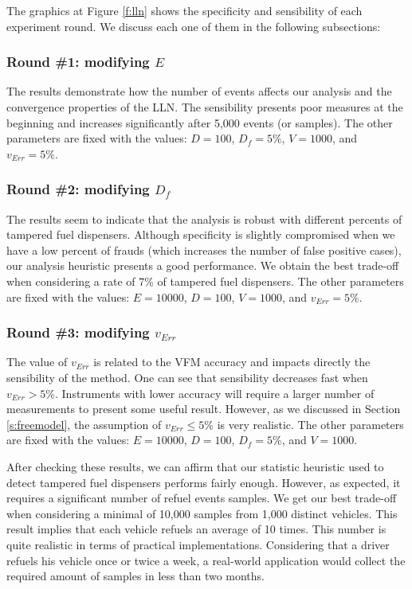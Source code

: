 \documentclass[sigplan]{acmart}
\begin{document}
The graphics at Figure \ref{f:lln} shows the specificity and sensibility of each experiment round.
We discuss each one of them in the following subsections:

\subsubsection{Round \#1: modifying $E$}
The results demonstrate how the number of events affects our analysis and the convergence properties of the LLN.
The sensibility presents poor measures at the beginning and increases significantly after 5,000 events (or samples).
The other parameters are fixed with the values: $D = 100$, $D_f = 5\%$, $V = 1000$, and $v_{Err} = 5\%$.

\subsubsection{Round \#2: modifying $D_f$}
The results seem to indicate that the analysis is robust with different percents of tampered fuel dispensers.
Although specificity is slightly compromised when we have a low percent of frauds (which increases the number of false positive cases), our analysis heuristic presents a good performance.
We obtain the best trade-off when considering a rate of 7\% of tampered fuel dispensers.
The other parameters are fixed with the values: $E = 10000$, $D = 100$, $V = 1000$, and $v_{Err} = 5\%$.

\subsubsection{Round \#3: modifying $v_{Err}$}
The value of $v_{Err}$ is related to the VFM accuracy and impacts directly the sensibility of the method.
One can see that sensibility decreases fast when $v_{Err} > 5\%$.
Instruments with lower accuracy will require a larger number of measurements to present some useful result.
However, as we discussed in Section \ref{s:freemodel}, the assumption of $v_{Err} \leq 5\%$ is very realistic.
The other parameters are fixed with the values: $E = 10000$, $D = 100$, $D_f = 5\%$, and $V = 1000$.

After checking these results, we can affirm that our statistic heuristic used to detect tampered fuel dispensers performs fairly enough.
However, as expected, it requires a significant number of refuel events samples.
We get our best trade-off when considering a minimal of 10,000 samples from 1,000 distinct vehicles.
This result implies that each vehicle refuels an average of 10 times.
This number is quite realistic in terms of practical implementations.
Considering that a driver refuels his vehicle once or twice a week, a real-world application would collect the required amount of samples in less than two months.
\end{document}

